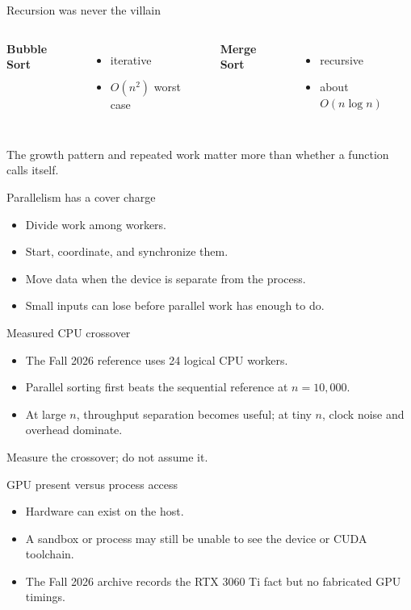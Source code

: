 \documentclass[aspectratio=169]{beamer}
\begin{document}
\begin{frame}{Recursion was never the villain}
  \begin{columns}[T]
      \textbf{Bubble Sort}
      \begin{itemize}
        \item iterative
        \item $O(n^2)$ worst case
      \end{itemize}
      \textbf{Merge Sort}
      \begin{itemize}
        \item recursive
        \item about $O(n\log n)$
      \end{itemize}
  \end{columns}
  \vfill
  The growth pattern and repeated work matter more than whether a function calls itself.
\end{frame}

\begin{frame}{Parallelism has a cover charge}
  \begin{itemize}
    \item Divide work among workers.
    \item Start, coordinate, and synchronize them.
    \item Move data when the device is separate from the process.
    \item Small inputs can lose before parallel work has enough to do.
  \end{itemize}
\end{frame}

\begin{frame}{Measured CPU crossover}
  \begin{itemize}
    \item The Fall 2026 reference uses 24 logical CPU workers.
    \item Parallel sorting first beats the sequential reference at $n=10{,}000$.
    \item At large $n$, throughput separation becomes useful; at tiny $n$, clock noise and overhead dominate.
  \end{itemize}
  \vfill
  \centering
  \Large Measure the crossover; do not assume it.
\end{frame}

\begin{frame}{GPU present versus process access}
  \begin{itemize}
    \item Hardware can exist on the host.
    \item A sandbox or process may still be unable to see the device or CUDA toolchain.
    \item The Fall 2026 archive records the RTX 3060 Ti fact but no fabricated GPU timings.
  \end{itemize}
\end{frame}
\end{document}
